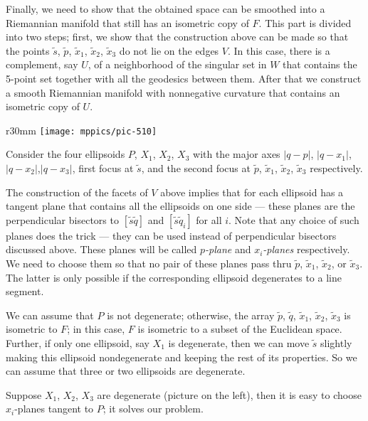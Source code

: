 \documentclass{article}
\begin{document}
\medskip

Finally, we need to show that the obtained space can be smoothed into a Riemannian manifold that still has an isometric copy of $F$.
This part is divided into two steps; first, we show that the construction above can be made so that the points $\tilde s$, $\tilde p$, $\tilde x_1$, $\tilde x_2$, $\tilde x_3$ do not lie on the edges $V$.
In this case, there is a complement, say $U$, of a neighborhood of the singular set in $W$ that contains
the 5-point set together with all the geodesics between them.
After that we construct a smooth Riemannian manifold with nonnegative curvature that contains an isometric copy of $U$.

\begin{wrapfigure}{r}{30mm}
\vskip-0mm
\centering
\texttt{[image: mppics/pic-510]}
\end{wrapfigure}

Consider the four ellipsoids $P$, $X_1$, $X_2$, $X_3$ with the major axes $|q-p|$, $|q-x_1|$, $|q-x_2|$,$|q-x_3|$, first focus at $\tilde s$, and the second focus at $\tilde p$, $\tilde x_1$, $\tilde x_2$, $\tilde x_3$ respectively.

The construction of the facets of $V$ above implies that for each ellipsoid has a tangent plane that contains all the ellipsoids on one side --- these planes are the perpendicular bisectors to $[\tilde s\tilde q]$ and $[\tilde s\tilde q_i]$ for all $i$.
Note that any choice of such planes does the trick --- they can be used instead of perpendicular bisectors discussed above.
These planes will be called \emph{$p$-plane} and \emph{$x_i$-planes} respectively.
We need to choose them so that no pair of these planes pass thru $\tilde p$, $\tilde x_1$, $\tilde x_2$, or $\tilde x_3$.
The latter is only possible if the corresponding ellipsoid degenerates to a line segment.

We can assume that $P$ is not degenerate; otherwise, the array $\tilde p$, $\tilde q$, $\tilde x_1$, $\tilde x_2$, $\tilde x_3$ is isometric to $F$;
in this case, $F$ is isometric to a subset of the Euclidean space.
Further, if only one ellipsoid, say $X_1$ is degenerate, then we can move $\tilde s$ slightly making this ellipsoid nondegenerate and keeping the rest of its properties.
So we can assume that three or two ellipsoids are degenerate.

Suppose $X_1$, $X_2$, $X_3$ are degenerate (picture on the left), then it is easy to choose $x_i$-planes tangent to $P$; it solves our problem.
\end{document}
